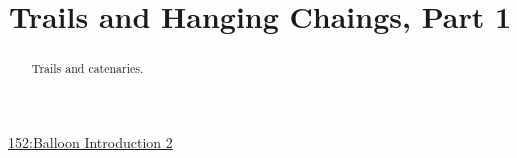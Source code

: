 \documentclass{ximera}
\title{Trails and Hanging Chaings, Part 1}
\begin{document}
\begin{abstract}
Trails and catenaries.
\end{abstract}
\maketitle


\begin{onlineOnly}
    \begin{center}
\end{center}
\end{onlineOnly}

\href{https://www.desmos.com/calculator/h6cworakdw}{152:Balloon Introduction 2}
\end{document}
